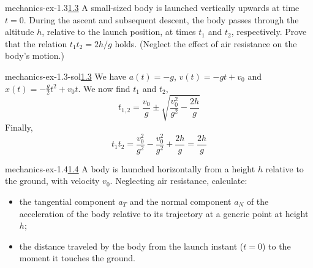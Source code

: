 \documentclass[preview]{standalone}
\begin{document}
\begin{snippetexercise}{mechanics-ex-1.3}{\underline{1.3}}
    A small-sized body is launched vertically upwards at time \(t = 0\).
    During the ascent and subsequent descent, the body passes through the altitude \( h \),
    relative to the launch position, at times \( t_1 \) and \( t_2 \), respectively.
    Prove that the relation \( t_1 t_2 = 2h/g \) holds.
    (Neglect the effect of air resistance on the body's motion.)
\end{snippetexercise}

\begin{snippetsolution}{mechanics-ex-1.3-sol}{\underline{1.3}}
    We have \(a(t) = -g\), \(v(t) = -gt + v_0\) and \(x(t) = -\frac{g}{2}t^2 + v_0t\).
    We now find \(t_1\) and \(t_2\),
    \[
        t_{1,2} = \frac{v_0}{g} \pm \sqrt{\frac{v_0^2}{g^2} - \frac{2h}{g}}
    \]
    Finally,
    \[
        t_1t_2 = \frac{v_0^2}{g^2} - \frac{v_0^2}{g^2} + \frac{2h}{g} = \frac{2h}{g}
    \]
\end{snippetsolution}

\begin{snippetexercise}{mechanics-ex-1.4}{\underline{1.4}}
    A body is launched horizontally from a height \( h \) relative to the ground, with velocity \( v_0 \). Neglecting air resistance, calculate:
    \begin{itemize}
        \item the tangential component \( a_T \) and the normal component \( a_N \) of the acceleration of the body relative to its trajectory at a generic point at height \( h \);
        \item the distance traveled by the body from the launch instant (\( t = 0 \)) to the moment it touches the ground.
    \end{itemize}
\end{snippetexercise}
\end{document}
